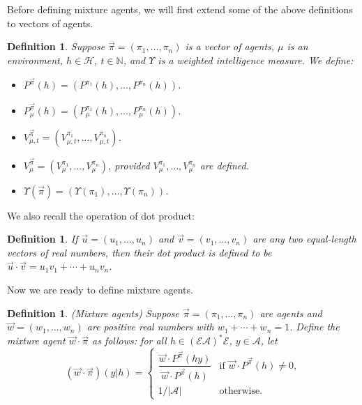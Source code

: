 \documentclass[twoside]{article}
\newtheorem{definition}[theorem]{Definition}
\begin{document}
Before defining mixture agents, we will first extend some of the above
definitions to vectors of agents.

\begin{definition}
\label{vectorizationdefn}
    Suppose $\vec\pi=(\pi_1,\ldots,\pi_n)$ is a vector of agents, $\mu$ is an environment,
    $h\in\mathcal H$, $t\in\mathbb N$, and $\Upsilon$ is a weighted
    intelligence measure. We define:
    \begin{itemize}
        \item ${P^{\vec\pi}}(h)=(P^{\pi_1}(h),\ldots,P^{\pi_n}(h))$.
        \item $P^{\vec\pi}_\mu(h)=(P^{\pi_1}_\mu(h),\ldots,P^{\pi_n}_\mu(h))$.
        \item $V^{\vec\pi}_{\mu,t}=(V^{\pi_1}_{\mu,t},\ldots,V^{\pi_n}_{\mu,t})$.
        \item $V^{\vec\pi}_\mu=(V^{\pi_1}_\mu,\ldots,V^{\pi_n}_\mu)$,
            provided $V^{\pi_1}_\mu,\ldots,V^{\pi_n}_\mu$ are defined.
        \item $\Upsilon(\vec\pi)=(\Upsilon(\pi_1),\ldots,\Upsilon(\pi_n))$.
    \end{itemize}
\end{definition}

We also recall the operation of dot product:

\begin{definition}
    If $\vec u=(u_1,\ldots,u_n)$ and
    $\vec v=(v_1,\ldots,v_n)$ are any two equal-length
    vectors of real numbers, then their \emph{dot product}
    is defined to be $\vec u\cdot \vec v=u_1v_1+\cdots+u_nv_n$.
\end{definition}

Now we are ready to define mixture agents.

\begin{definition}
\label{maindefn}
    (Mixture agents)
    Suppose $\vec\pi=(\pi_1,\ldots,\pi_n)$ are agents and $\vec w=(w_1,\ldots,w_n)$
    are positive real numbers with $w_1+\cdots+w_n=1$.
    Define the \emph{mixture agent} $\vec w\cdot\vec\pi$ as follows: for all
    $h\in (\mathcal E\mathcal A)^*\mathcal E$, $y\in\mathcal A$, let
    \[
        (\vec w\cdot\vec\pi)(y|h)
        =
        \begin{cases}
            \dfrac{\vec w\cdot {P^{\vec\pi}}(hy)}{\vec w\cdot {P^{\vec\pi}}(h)}
            &\mbox{if $\vec w\cdot {P^{\vec\pi}}(h)\not=0$,}\\
            1/|\mathcal{A}| &\mbox{otherwise.}
        \end{cases}
    \]
\end{definition}
\end{document}
